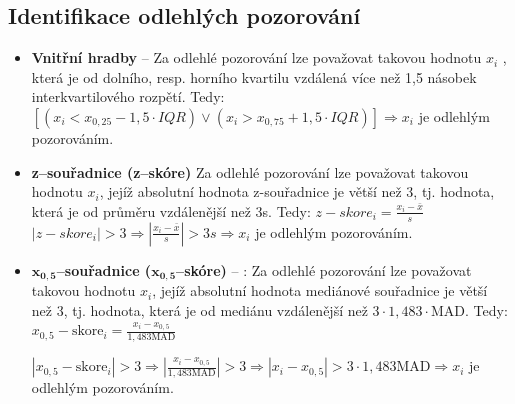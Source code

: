 \subsection{Identifikace odlehlých pozorování}
\begin{itemize}
	\item \textbf{Vnitřní hradby} -- Za odlehlé pozorování lze považovat takovou hodnotu $x_i$ , která je od dolního, resp. horního kvartilu vzdálená více než 1,5 násobek interkvartilového rozpětí. Tedy: $[(x_i < x_{0,25} - 1,5 \cdot IQR) \vee (x_i > x_{0,75} + 1,5 \cdot IQR)] \Rightarrow x_i$ je odlehlým pozorováním. 
	\item \textbf{z--souřadnice (z--skóre)} Za odlehlé pozorování lze považovat takovou hodnotu $x_i$, jejíž absolutní hodnota z-souřadnice je větší než 3, tj. hodnota, která je od průměru vzdálenější než 3s. Tedy: $z-skore_i = \frac{x_i - \bar{x}}{s}$ \\	
		$|z-skore_i| > 3 \Rightarrow |\frac{x_i - \bar{x}}{s}| >3s \Rightarrow x_i$ je odlehlým pozorováním.

	\item $\mathbf{x_{0,5}}$\textbf{--souřadnice ($\mathbf{x_{0,5}}$--skóre)} -- : Za odlehlé pozorování lze považovat takovou hodnotu $x_i$, jejíž absolutní hodnota mediánové souřadnice je větší než 3, tj. hodnota, která je od mediánu vzdálenější než $3 \cdot 1,483\cdot \textrm{MAD}$. Tedy: $x_{0,5}-\textrm{skore}_i = \frac{x_i - x_{0,5}}{1,483\textrm{MAD}}$
	
		$|x_{0,5}-\textrm{skore}_i| > 3 \Rightarrow |\frac{x_i - x_{0,5}}{1,483\textrm{MAD}}| >3 \Rightarrow |x_i - x_{0,5}| >3 \cdot 1,483\textrm{MAD} \Rightarrow x_i$ je odlehlým pozorováním.
\end{itemize}

